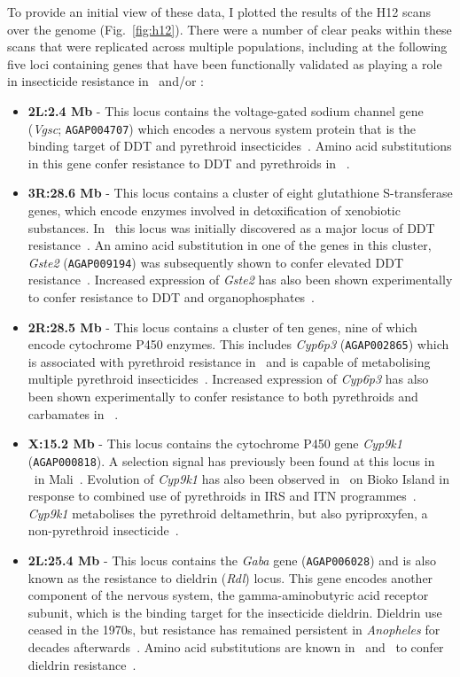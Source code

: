 \documentclass[a4paper,11pt,abstracton,hidelinks]{scrartcl}
\begin{document}
To provide an initial view of these data, I plotted the results of the H12 scans over the genome (Fig.~\ref{fig:h12}).
%
There were a number of clear peaks within these scans that were replicated across multiple populations, including at the following five loci containing genes that have been functionally validated as playing a role in insecticide resistance in \agam\ and/or \acol:
%
\begin{itemize}
\item \textbf{2L:2.4 Mb} - This locus contains the voltage-gated sodium channel gene (\textit{Vgsc}; \texttt{AGAP004707}) which encodes a nervous system protein that is the binding target of DDT and pyrethroid insecticides~\parencite{Dong2014}.
%
Amino acid substitutions in this gene confer resistance to DDT and pyrethroids in \agam~\parencite{MartinezTorres1998,Ranson2000a,Jones2012,Wang2015}.
\item \textbf{3R:28.6 Mb} - This locus contains a cluster of eight glutathione S-transferase genes, which encode enzymes involved in detoxification of xenobiotic substances.
%
In \agam\ this locus was initially discovered as a major locus of DDT resistance~\parencite{Prapanthadara1993,Ranson2000b,Ranson2001,Ding2003}.
%
An amino acid substitution in one of the genes in this cluster, \textit{Gste2} (\texttt{AGAP009194}) was subsequently shown to confer elevated DDT resistance~\parencite{Mitchell2014}.
%
Increased expression of \textit{Gste2} has also been shown experimentally to confer resistance to DDT and organophosphates~\parencite{Adolfi2019}.
\item \textbf{2R:28.5 Mb} - This locus contains a cluster of ten genes, nine of which encode cytochrome P450 enzymes.
%
This includes \textit{Cyp6p3} (\texttt{AGAP002865}) which is associated with pyrethroid resistance in \agam\ and is capable of metabolising multiple pyrethroid insecticides~\parencite{Muller2008}.
%
Increased expression of \textit{Cyp6p3} has also been shown experimentally to confer resistance to both pyrethroids and carbamates in \agam~\parencite{Adolfi2019}.
\item \textbf{X:15.2 Mb} - This locus contains the cytochrome P450 gene \textit{Cyp9k1} (\texttt{AGAP000818}).
%
A selection signal has previously been found at this locus in \acol\ in Mali~\parencite{Main2015}.
%
Evolution of \textit{Cyp9k1} has also been observed in \acol\ on Bioko Island in response to combined use of pyrethroids in IRS and ITN programmes~\parencite{Vontas2018}.
%
\textit{Cyp9k1} metabolises the pyrethroid deltamethrin, but also pyriproxyfen, a non-pyrethroid insecticide~\parencite{Vontas2018}.
\item \textbf{2L:25.4 Mb} - This locus contains the \textit{Gaba} gene (\texttt{AGAP006028}) and is also known as the resistance to dieldrin (\textit{Rdl}) locus.
%
This gene encodes another component of the nervous system,  the gamma-aminobutyric acid receptor subunit, which is the binding target for the insecticide dieldrin.
%
Dieldrin use ceased in the 1970s, but resistance has remained persistent in \textit{Anopheles} for decades afterwards~\parencite{Du2005}.
%
Amino acid substitutions are known in \agam\ and \acol\ to confer dieldrin resistance~\parencite{Du2005,Lawniczak2010}.
\end{itemize}
\end{document}
